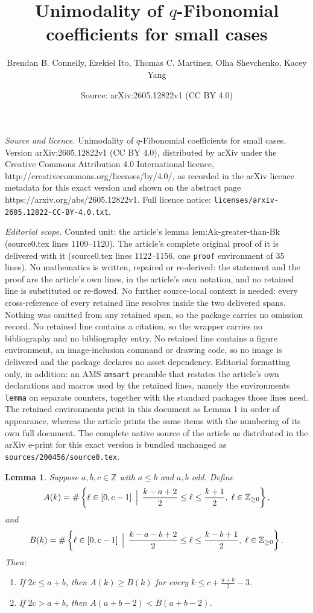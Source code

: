 \documentclass[10pt,a4paper]{amsart}
\title{Unimodality of $q$-Fibonomial coefficients for small cases}
\author{Brendan B. Connelly, Ezekiel Ito, Thomas C. Martinez, Olha Shevchenko, Kacey Yang}
\date{Source: arXiv:2605.12822v1 (CC BY 4.0)}
\newtheorem{lemma}{Lemma}
\def\Z{\mathbb{Z}}
\begin{document}
\maketitle

\noindent\emph{Source and licence.} Unimodality of $q$-Fibonomial coefficients for small cases. Version arXiv:2605.12822v1 (CC BY 4.0), distributed by arXiv under the Creative Commons Attribution 4.0 International licence, http://creativecommons.org/licenses/by/4.0/, as recorded in the arXiv licence metadata for this exact version and shown on the abstract page https://arxiv.org/abs/2605.12822v1. Full licence notice: \texttt{licenses/arxiv-2605.12822-CC-BY-4.0.txt}.\par\smallskip

\noindent\textit{Editorial scope.} Counted unit: the article's lemma lem:Ak-greater-than-Bk (source0.tex lines 1109--1120). The article's complete original proof of it is delivered with it (source0.tex lines 1122--1156, one \texttt{proof} environment of 35 lines). No mathematics is written, repaired or re-derived: the statement and the proof are the article's own lines, in the article's own notation, and no retained line is substituted or re-flowed.  No further source-local context is needed: every cross-reference of every retained line resolves inside the two delivered spans.  Nothing was omitted from any retained span, so the package carries no omission record.  No retained line contains a citation, so the wrapper carries no bibliography and no bibliography entry.  No retained line contains a figure environment, an image-inclusion command or drawing code, so no image is delivered and the package declares no asset dependency.  Editorial formatting only, in addition: an AMS \texttt{amsart} preamble that restates the article's own declarations and macros used by the retained lines, namely the environments \texttt{lemma} on separate counters, together with the standard packages those lines need.  The retained environments print in this document as Lemma 1 in order of appearance, whereas the article prints the same items with the numbering of its own full document.  The complete native source of the article as distributed in the arXiv e-print for this exact version is bundled unchanged as \texttt{sources/200456/source0.tex}.
\begin{lemma}
    Suppose $a,b,c\in\mathbb{Z}$ with $a \leq b$ and $a,b$ odd. Define
    $$A(k) = \# \left \{ \ell \in [0, c - 1] \, \Bigm| \, \frac{k - a + 2}{2} \le \ell  \le \frac{k + 1}{2}, \; \ell \in \Z_{\geq 0} \right \},$$
    and 
    $$B(k) =  \# \left \{ \ell \in [0, c - 1] \, \Bigm|\, \frac{k - a - b + 2}{2} \le \ell \le \frac{k - b + 1}{2}, \; \ell \in \Z_{\geq0} \right \}.$$
    Then:
    \begin{enumerate}
        \item If $2c \leq a+b$, then $A(k) \geq B(k)$ for every $k \leq c + \frac{a+b}{2} - 3$.
        \item If $2c > a+b$, then $A(a+b-2) < B(a+b-2)$.
    \end{enumerate}
    \label{lem:Ak-greater-than-Bk}
\end{lemma}
\end{document}

